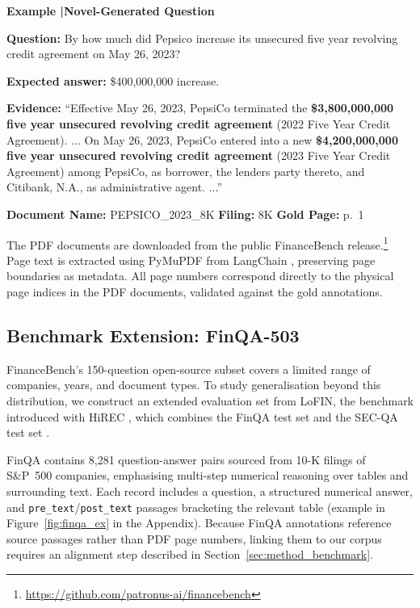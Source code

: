 \documentclass[12pt,twoside,maitrise]{dms}
\newcounter{example}
\theoremstyle{definition}
\numberwithin{equation}{section}
\numberwithin{table}{chapter}
\numberwithin{figure}{chapter}
\newcounter{failex}
\newenvironment{failex}[1]{%
  \refstepcounter{failex}%
  \begin{mdframed}[
    linewidth=0.8pt,
    linecolor=black,
    innertopmargin=10pt,
    innerbottommargin=10pt,
    innerleftmargin=14pt,
    innerrightmargin=14pt,
    skipabove=\baselineskip,
    skipbelow=\baselineskip,
  ]
  \noindent\textbf{Example \thefailex\enspace|\enspace #1}
  \par\medskip
}{%
  \end{mdframed}%
}
\begin{document}
\begin{failex}{Novel-Generated Question}
\label{ex:novelgen}

\noindent\textbf{Question:}\enspace
By how much did Pepsico increase its unsecured five year revolving credit agreement
on May 26, 2023?

\medskip
\noindent\textbf{Expected answer:}\enspace
\$400,000,000 increase.

\medskip
\noindent\textbf{Evidence:}\enspace
``Effective May 26, 2023, PepsiCo terminated the
\textbf{\$3{,}800{,}000{,}000 five year unsecured revolving credit agreement}
(2022 Five Year Credit Agreement).
...
On May 26, 2023, PepsiCo entered into a new
\textbf{\$4{,}200{,}000{,}000 five year unsecured revolving credit agreement}
(2023 Five Year Credit Agreement) among PepsiCo, as borrower, the lenders party
thereto, and Citibank, N.A., as administrative agent.
...''

\medskip
\noindent\textbf{Document Name:} PEPSICO\_2023\_8K \quad \textbf{Filing:} 8K \quad \textbf{Gold Page:} p.~1
\end{failex}
\vspace{1em}

The PDF documents are downloaded from the public FinanceBench
release.\footnote{\url{https://github.com/patronus-ai/financebench}} Page text is
extracted using PyMuPDF from LangChain \citep{Chase_LangChain_2022}, preserving page
boundaries as metadata. All page numbers correspond directly to the physical page
indices in the PDF documents, validated against the gold annotations.

\subsection{Benchmark Extension: FinQA-503}
\label{sec:extended_sources}

FinanceBench's 150-question open-source subset covers a limited range of companies,
years, and document types. To study generalisation beyond this distribution, we
construct an extended evaluation set from LoFIN, the benchmark introduced with HiREC
\citep{choe2025hirec}, which combines the FinQA test set \citep{chen2021finqa} and the
SEC-QA test set \citep{lai2024secqa}.

FinQA \citep{chen2021finqa} contains 8,281 question-answer pairs sourced from 10-K
filings of S\&P~500 companies, emphasising multi-step numerical reasoning over tables
and surrounding text. Each record includes a question, a structured numerical answer,
and \texttt{pre\_text}/\texttt{post\_text} passages bracketing the relevant table
(example in Figure~\ref{fig:finqa_ex} in the Appendix). Because FinQA annotations
reference source passages rather than PDF page numbers, linking them to our corpus
requires an alignment step described in Section~\ref{sec:method_benchmark}.
\end{document}
